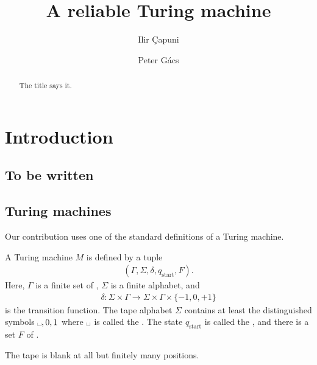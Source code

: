 \documentclass[12pt]{memoir}
\newcommand{\blank}{\text{\textvisiblespace}}
\newcommand{\start}{\mathrm{start}}
\begin{document}
\title{A reliable Turing machine}

\author{Ilir \c{C}apuni \and Peter G\'acs}

\maketitle
\thispagestyle{empty}

\begin{abstract}
The title says it.
\end{abstract}

\tableofcontents

\section{Introduction}

\subsection{To be written}

\subsection{Turing machines}\label{sec:TM}

Our contribution uses one of the standard definitions of a Turing
machine.

    A Turing machine \( M \) is defined by a tuple
        \begin{align*}
             (\Gamma, \Sigma,\delta, q_{\start},F).
        \end{align*}
    Here, \( \Gamma \) is a finite set of ,
    \( \Sigma \) is a finite alphabet, and
        \begin{align*}
             \delta\colon\Sigma\times \Gamma\to \Sigma\times\Gamma\times\{-1,0,+1\}
        \end{align*}
    is the transition function.
The tape alphabet \( \Sigma \) contains at least the distinguished
symbols \( \blank,0,1 \) where \( \blank \) is called the .
The state \( q_{\start} \) is called the , and
there is a set \( F \) of .

    The tape is blank at all but finitely many positions.
\end{document}
